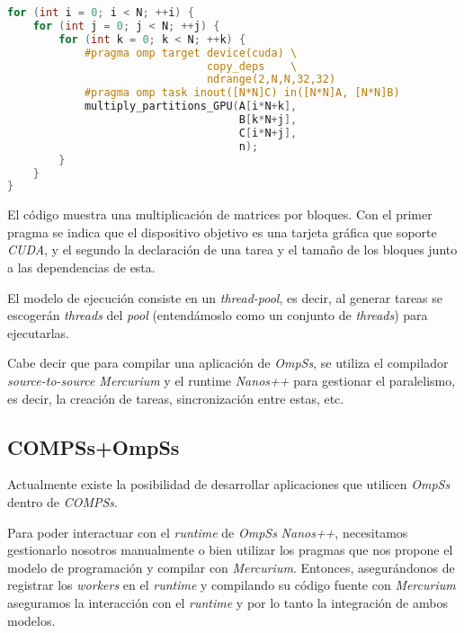 \begin{lstlisting}[caption={Multiplicación de un bloque de una matriz utilizando GPUs.}, captionpos=b, label={lst:ompssmatmul.cc}, language=C++]
for (int i = 0; i < N; ++i) {
    for (int j = 0; j < N; ++j) {
        for (int k = 0; k < N; ++k) {
            #pragma omp target device(cuda) \
                               copy_deps    \
                               ndrange(2,N,N,32,32)
            #pragma omp task inout([N*N]C) in([N*N]A, [N*N]B)
            multiply_partitions_GPU(A[i*N+k], 
                                    B[k*N+j], 
                                    C[i*N+j], 
                                    n);
        }
    }
}
\end{lstlisting}

El código muestra una multiplicación de matrices por bloques. Con el primer pragma se indica que el dispositivo objetivo es una tarjeta gráfica que soporte \textit{CUDA}, y el segundo la declaración de una tarea y el tamaño de los bloques junto a las dependencias de esta.
\par\bigskip

El modelo de ejecución consiste en un \textit{thread-pool}, es decir, al generar tareas se escogerán \textit{threads} del \textit{pool} (entendámoslo como un conjunto de \textit{threads}) para ejecutarlas.
\par\bigskip

Cabe decir que para compilar una aplicación de \textit{OmpSs}, se utiliza el compilador \textit{source-to-source Mercurium} y el runtime \textit{Nanos++} para gestionar el paralelismo, es decir, la creación de tareas, sincronización entre estas, etc.

\subsection{COMPSs+OmpSs} \label{compssompss}

Actualmente existe la posibilidad de desarrollar aplicaciones que utilicen \textit{OmpSs} dentro de \textit{COMPSs}. 
\par\bigskip
Para poder interactuar con el \textit{runtime} de \textit{OmpSs} \textit{Nanos++}, necesitamos gestionarlo nosotros manualmente o bien utilizar los pragmas que nos propone el modelo de programación y compilar con \textit{Mercurium}. Entonces, asegurándonos de registrar los \textit{workers} en el \textit{runtime} y compilando su código fuente con \textit{Mercurium} aseguramos la interacción con el \textit{runtime} y por lo tanto la integración de ambos modelos.

